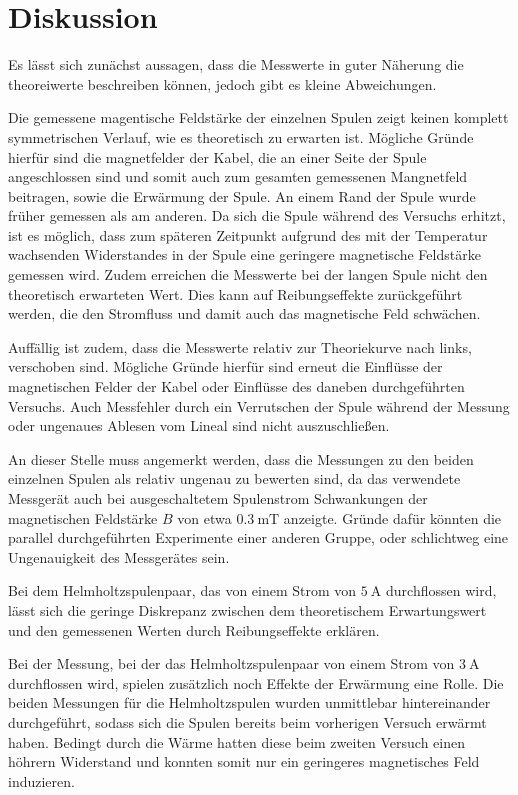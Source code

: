 \section{Diskussion}
\label{sec:Diskussion}
Es lässt sich zunächst aussagen, dass die Messwerte in guter Näherung die theoreiwerte
beschreiben können, jedoch gibt es kleine Abweichungen.

Die gemessene magentische Feldstärke der einzelnen Spulen zeigt keinen komplett
symmetrischen Verlauf, wie es theoretisch zu erwarten ist. Mögliche Gründe hierfür sind
die magnetfelder der Kabel, die an einer Seite der Spule angeschlossen sind und somit
auch zum gesamten gemessenen Mangnetfeld beitragen, sowie die Erwärmung der Spule.
An einem Rand der Spule wurde früher gemessen als am anderen. Da sich die Spule
während des Versuchs erhitzt, ist es möglich, dass zum späteren Zeitpunkt aufgrund des
mit der Temperatur wachsenden Widerstandes in der Spule eine geringere magnetische
Feldstärke gemessen wird. Zudem erreichen die Messwerte bei der langen Spule nicht
den theoretisch erwarteten Wert. Dies kann auf Reibungseffekte zurückgeführt werden,
die den Stromfluss und damit auch das magnetische Feld schwächen.

Auffällig ist zudem, dass die Messwerte relativ zur Theoriekurve nach links, verschoben sind.
Mögliche Gründe hierfür sind erneut die Einflüsse der magnetischen Felder der Kabel oder
Einflüsse des daneben durchgeführten Versuchs. Auch Messfehler durch ein Verrutschen
der Spule während der Messung oder ungenaues Ablesen vom Lineal sind nicht auszuschließen.

An dieser Stelle muss angemerkt werden, dass die Messungen zu den beiden einzelnen Spulen
als relativ ungenau zu bewerten sind, da das verwendete Messgerät auch bei ausgeschaltetem
Spulenstrom Schwankungen der magnetischen Feldstärke $B$ von etwa $\SI{0,3}{\milli\tesla}$ anzeigte.
Gründe dafür könnten die parallel durchgeführten Experimente einer anderen Gruppe,
oder schlichtweg eine Ungenauigkeit des Messgerätes sein.

Bei dem Helmholtzspulenpaar, das von einem
Strom von $\SI{5}{\ampere}$ durchflossen wird, lässt sich die geringe Diskrepanz zwischen dem
theoretischem Erwartungswert und den gemessenen Werten durch Reibungseffekte erklären.

Bei der Messung, bei der das Helmholtzspulenpaar von einem Strom von $\SI{3}{\ampere}$ durchflossen
wird, spielen zusätzlich noch Effekte der Erwärmung eine Rolle. Die beiden Messungen
für die Helmholtzspulen wurden unmittlebar hintereinander durchgeführt, sodass sich die
Spulen bereits beim vorherigen Versuch erwärmt haben. Bedingt durch die Wärme
hatten diese beim zweiten Versuch einen höhrern Widerstand und konnten somit nur ein
geringeres magnetisches Feld induzieren.

